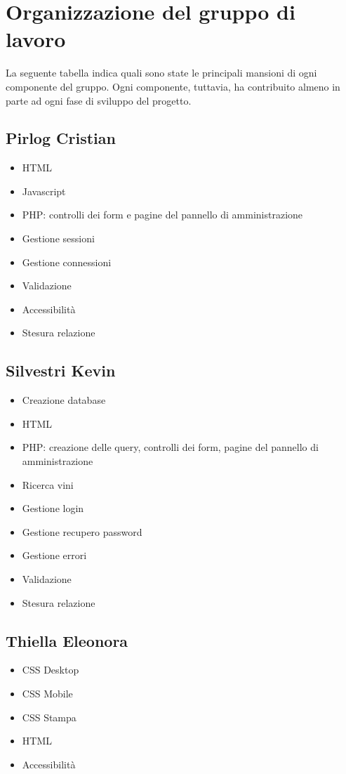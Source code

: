\section{Organizzazione del gruppo di lavoro}

La seguente tabella indica quali sono state le principali mansioni di ogni componente del gruppo. Ogni componente, tuttavia, ha contribuito almeno in parte ad ogni fase di sviluppo del progetto.

\subsection{Pirlog Cristian}

\begin{itemize}
	\item HTML
	\item Javascript
	\item PHP: controlli dei form e pagine del pannello di amministrazione
	\item Gestione sessioni
	\item Gestione connessioni
	\item Validazione
	\item Accessibilità
	\item Stesura relazione
\end{itemize}

\subsection{Silvestri Kevin}
\begin{itemize}
	\item Creazione database
	\item HTML
	\item PHP: creazione delle query, controlli dei form, pagine del pannello di amministrazione
	\item Ricerca vini
	\item Gestione login
	\item Gestione recupero password
	\item Gestione errori
	\item Validazione
	\item Stesura relazione
\end{itemize}

\subsection{Thiella Eleonora}

\begin{itemize}
	\item CSS Desktop
	\item CSS Mobile
	\item CSS Stampa
	\item HTML
	\item Accessibilità
\end{itemize}

